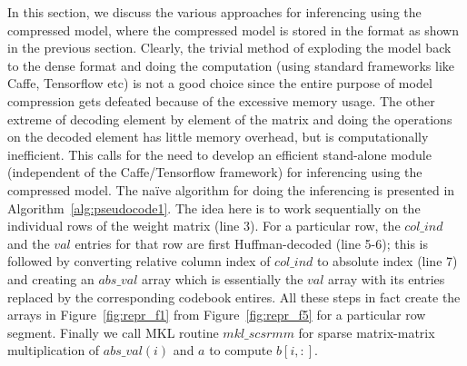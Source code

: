 
In this section, we discuss the various approaches for inferencing using the compressed model,
where the compressed model is stored  in  the format as shown in the previous section.
Clearly, the trivial method of exploding the model back to the dense format  and doing the computation 
(using standard frameworks like Caffe, Tensorflow etc) is not a good choice since the entire purpose of
model compression gets defeated because  of the 
excessive memory usage. The other extreme of decoding element by element of the matrix and doing the operations on the
decoded element 
has little memory overhead, but is computationally inefficient.
This calls for the need to develop an efficient stand-alone module (independent of the
Caffe/Tensorflow framework) for inferencing using the compressed model.
The na{\"i}ve algorithm for doing the inferencing is presented in Algorithm~\ref{alg:pseudocode1}.
The idea here is to work  sequentially on the individual rows of the weight matrix (line 3).
For a particular row, the $col\_ind$ and the $val$ entries for that row are first  Huffman-decoded (line 5-6);
this is followed by converting relative column index of $col\_ind$ to absolute index (line 7) 
and creating an $abs\_val$ array which  is essentially the $val$ array with its entries replaced by the
corresponding codebook entires. 
All these steps  in fact  create the arrays in Figure~\ref{fig:repr_f1} from 
Figure~\ref{fig:repr_f5} for a particular row segment.
Finally we call MKL routine $mkl\_scsrmm$ for 
sparse matrix-matrix multiplication  of $abs\_val(i)$ and $a$
to compute $b[i,:]$.




